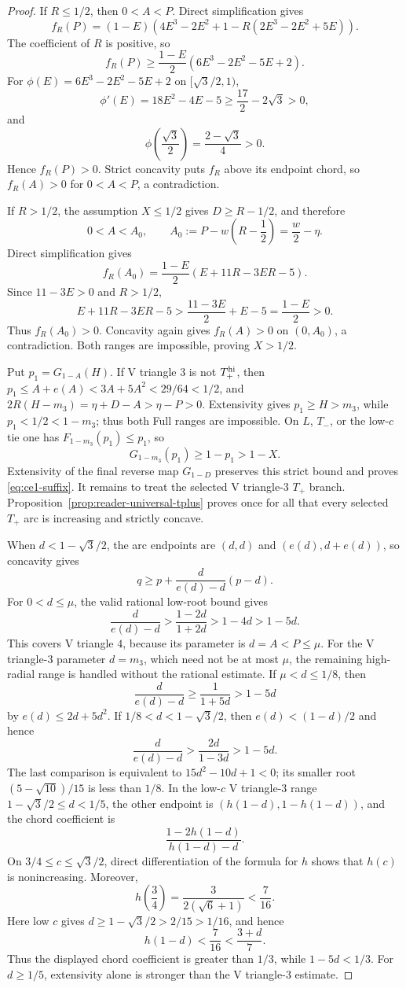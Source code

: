 \begin{proof}
If $R\le1/2$, then $0<A<P$.  Direct simplification gives
\[
 f_R(P)
 =(1-E)\left(
 4E^3-2E^2+1-R(2E^3-2E^2+5E)
 \right).
\]
The coefficient of $R$ is positive, so
\[
 f_R(P)\ge
 \frac{1-E}{2}\left(6E^3-2E^2-5E+2\right).
\]
For $\phi(E)=6E^3-2E^2-5E+2$ on
$[\sqrt3/2,1)$,
\[
 \phi'(E)=18E^2-4E-5
 \ge\frac{17}{2}-2\sqrt3>0,
\]
and
\[
 \phi\left(\frac{\sqrt3}{2}\right)
 =\frac{2-\sqrt3}{4}>0.
\]
Hence $f_R(P)>0$.  Strict concavity puts $f_R$ above its endpoint chord,
so $f_R(A)>0$ for $0<A<P$, a contradiction.

If $R>1/2$, the assumption $X\le1/2$ gives
$D\ge R-1/2$, and therefore
\[
 0<A<A_0,
 \qquad
 A_0:=P-w\left(R-\frac12\right)=\frac w2-\eta.
\]
Direct simplification gives
\[
 f_R(A_0)
 =\frac{1-E}{2}(E+11R-3ER-5).
\]
Since $11-3E>0$ and $R>1/2$,
\[
 E+11R-3ER-5
 >\frac{11-3E}{2}+E-5
 =\frac{1-E}{2}>0.
\]
Thus $f_R(A_0)>0$.  Concavity again gives $f_R(A)>0$ on $(0,A_0)$, a
contradiction.  Both ranges are impossible, proving $X>1/2$.

Put $p_1=G_{1-A}(H)$.  If V triangle $3$ is not $T_+^{\rm hi}$, then
$p_1\le A+e(A)<3A+5A^2<29/64<1/2$, and
$2R(H-m_3)=\eta+D-A>\eta-P>0$.  Extensivity gives
$p_1\ge H>m_3$, while $p_1<1/2<1-m_3$; thus both Full ranges are impossible.
On $L$, $T_-$, or the low-$c$ tie one has $F_{1-m_3}(p_1)\le p_1$, so
\[
 G_{1-m_3}(p_1)\ge1-p_1>1-X.
\]
Extensivity of the final reverse map $G_{1-D}$ preserves this strict bound
and proves \eqref{eq:ce1-suffix}.  It remains to treat the selected V triangle-$3$
$T_+$ branch.  Proposition~\ref{prop:reader-universal-tplus} proves once
for all that every selected $T_+$ arc is increasing and strictly concave.

When $d<1-\sqrt3/2$, the arc endpoints are
$(d,d)$ and $(e(d),d+e(d))$, so concavity gives
\begin{equation}
 q\ge p+\frac{d}{e(d)-d}(p-d).
 \label{eq:ce1-selected-chord}
\end{equation}
For $0<d\le\mu$, the valid rational low-root bound gives
\[
 \frac{d}{e(d)-d}>\frac{1-2d}{1+2d}>1-4d>1-5d.
\]
This covers V triangle $4$, because its parameter is $d=A<P\le\mu$.  For the
V triangle-$3$ parameter $d=m_3$, which need not be at most $\mu$, the remaining
high-radial range is handled without the rational estimate.  If
$\mu<d\le1/8$, then
\[
 \frac{d}{e(d)-d}\ge\frac1{1+5d}>1-5d
\]
by $e(d)\le2d+5d^2$.  If
$1/8<d<1-\sqrt3/2$, then $e(d)<(1-d)/2$ and hence
\[
 \frac{d}{e(d)-d}>\frac{2d}{1-3d}>1-5d.
\]
The last comparison is equivalent to $15d^2-10d+1<0$; its smaller root
$(5-\sqrt{10})/15$ is less than $1/8$.  In the low-$c$ V triangle-$3$ range
$1-\sqrt3/2\le d<1/5$, the other endpoint is
$(h(1-d),1-h(1-d))$, and the chord coefficient is
\[
 \frac{1-2h(1-d)}{h(1-d)-d}.
\]
On $3/4\le c\le\sqrt3/2$, direct differentiation of the formula for $h$
shows that $h(c)$ is nonincreasing.  Moreover,
\[
 h\left(\frac34\right)
 =\frac{3}{2(\sqrt6+1)}<\frac7{16}.
\]
Here low $c$ gives $d\ge1-\sqrt3/2>2/15>1/16$, and hence
\[
 h(1-d)<\frac7{16}<\frac{3+d}{7}.
\]
Thus the displayed chord coefficient is greater than $1/3$, while
$1-5d<1/3$.
For $d\ge1/5$, extensivity alone is stronger than the V triangle-$3$ estimate.


\end{proof}
